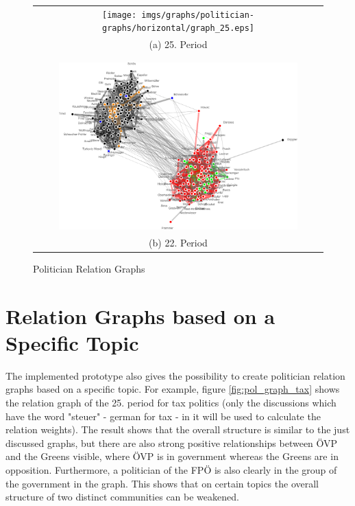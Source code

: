 \begin{figure}
\center
\begin{tabular}{ c }
	\texttt{[image: imgs/graphs/politician-graphs/horizontal/graph\_25.eps]}
	\\
	(a) 25. Period
	\\
	\\
	\hline
	\\
	
	\includegraphics[width=0.85\textwidth]{imgs/graphs/politician-graphs/horizontal/graph_22.eps}
	\\
	(b) 22. Period
\end{tabular}
	
	
	\caption{Politician Relation Graphs}
	\label{fig:pol_graphs1}
\end{figure}

\section{Relation Graphs based on a Specific Topic}
The implemented prototype also gives the possibility to create politician relation graphs based on a specific topic. For example, figure \ref{fig:pol_graph_tax} shows the relation graph of the 25. period for tax politics (only the discussions which have the word "steuer" - german for tax - in it will be used to calculate the relation weights). The result shows that the overall structure is similar to the just discussed graphs, but there are also strong positive relationships between ÖVP and the Greens visible, where ÖVP is in government whereas the Greens are in opposition. Furthermore, a politician of the FPÖ is also clearly in the group of the government in the graph. This shows that on certain topics the overall structure of two distinct communities can be weakened.

